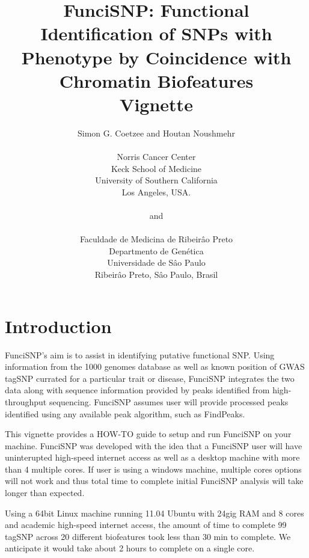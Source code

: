 \documentclass[a4paper]{article}
\begin{document}
\title{FunciSNP: Functional Identification of SNPs with\\Phenotype by 
Coincidence with Chromatin Biofeatures\\Vignette}
\author{Simon G. Coetzee and Houtan Noushmehr\\\\Norris Cancer Center\\Keck 
School of Medicine\\University of Southern California\\Los Angeles, USA.\\\\
and\\\\Faculdade de Medicina de Ribeir\^{a}o Preto\\Departmento de 
Gen\'{e}tica\\Universidade de S\^{a}o Paulo\\Ribeir\^{a}o Preto, S\^{a}o Paulo, 
Brasil}

\maketitle
\section*{Introduction}
FunciSNP's aim is to assist in identifying putative functional SNP. Using 
information from the 1000 genomes database as well as known position of GWAS
tagSNP currated for a particular trait or disease, FunciSNP integrates the 
two data along with sequence information provided by peaks identified from 
high-throughput sequencing. FunciSNP assumes user will provide processed 
peaks identified using any available peak algorithm, such as FindPeaks.

This vignette provides a HOW-TO guide to setup and run FunciSNP on your 
machine. FunciSNP was developed with the idea that a FunciSNP user will 
have uninterupted high-speed internet access as well as a desktop machine
 with more than 4 multiple cores. If user is using a windows machine, multiple
 cores options will not work and thus total time to complete initial FunciSNP
  analysis will take longer than expected.

Using a 64bit Linux machine running 11.04 Ubuntu with 24gig RAM and 8 cores
 and academic high-speed internet access, the amount of time to complete 99
 tagSNP across 20 different biofeatures took less than 30 min to complete. 
 We anticipate it would take about 2 hours to complete on a single core.
\end{document}
